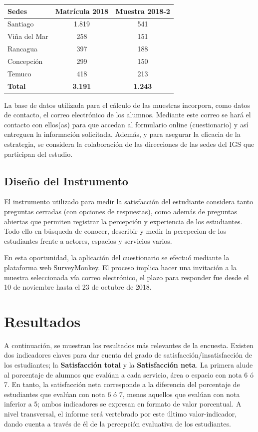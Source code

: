\documentclass[]{book}
\begin{document}
\begin{longtable}[]{@{}lcc@{}}
\toprule
Sedes & Matrícula 2018 & Muestra 2018-2\tabularnewline
\midrule
\endhead
Santiago & 1.819 & 541\tabularnewline
Viña del Mar & 258 & 151\tabularnewline
Rancagua & 397 & 188\tabularnewline
Concepción & 299 & 150\tabularnewline
Temuco & 418 & 213\tabularnewline
\textbf{Total} & \textbf{3.191} & \textbf{1.243}\tabularnewline
\bottomrule
\end{longtable}

La base de datos utilizada para el cálculo de las muestras incorpora,
como datos de contacto, el correo electrónico de los alumnos. Mediante
este correo se hará el contacto con ellos(as) para que accedan al
formulario online (cuestionario) y así entreguen la información
solicitada. Además, y para asegurar la eficacia de la estrategia, se
considera la colaboración de las direcciones de las sedes del IGS que
participan del estudio.

\section{Diseño del Instrumento}\label{diseno-del-instrumento}

El instrumento utilizado para medir la satisfacción del estudiante
considera tanto preguntas cerradas (con opciones de respuestas), como
además de preguntas abiertas que permiten registrar la percepción y
experiencia de los estudiantes. Todo ello en búsqueda de conocer,
describir y medir la percpecion de los estudiantes frente a actores,
espacios y servicios varios.

En esta oportunidad, la aplicación del cuestionario se efectuó mediante
la plataforma web SurveyMonkey. El proceso implica hacer una invitación
a la muestra seleccionada vía correo electrónico, el plazo para
responder fue desde el 10 de noviembre hasta el 23 de octubre de 2018.

\chapter{Resultados}\label{resultados}

A continuación, se muestran los resultados más relevantes de la
encuesta. Existen dos indicadores claves para dar cuenta del grado de
satisfacción/insatisfacción de los estudiantes; la \textbf{Satisfacción
total} y la \textbf{Satisfacción neta}. La primera alude al porcentaje
de alumnos que evalúan a cada servicio, área o espacio con nota 6 ó 7.
En tanto, la satisfacción neta corresponde a la diferencia del
porcentaje de estudiantes que evalúan con nota 6 ó 7, menos aquellos que
evalúan con nota inferior a 5; ambos indicadores se expresan en formato
de valor porcentual. A nivel transversal, el informe será vertebrado por
este último valor-indicador, dando cuenta a través de él de la
percepción evaluativa de los estudiantes.
\end{document}
